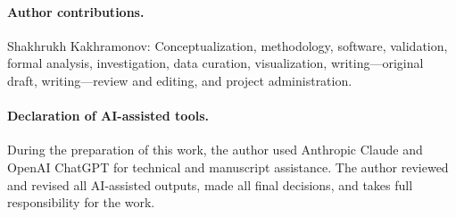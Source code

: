 \documentclass[11pt,letterpaper]{article}
\begin{document}
\paragraph{Author contributions.} Shakhrukh Kakhramonov:
Conceptualization, methodology, software, validation, formal analysis,
investigation, data curation, visualization, writing---original draft,
writing---review and editing, and project administration.

\paragraph{Declaration of AI-assisted tools.} During the preparation of
this work, the author used Anthropic Claude and OpenAI ChatGPT for
technical and manuscript assistance. The author reviewed and revised all
AI-assisted outputs, made all final decisions, and takes full
responsibility for the work.


\end{document}
